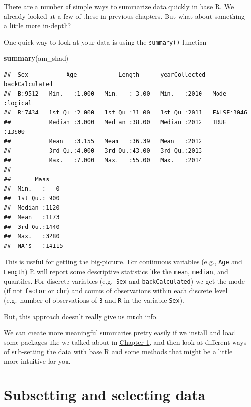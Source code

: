 \documentclass[
]{book}
\newenvironment{Shaded}{\begin{snugshade}}{\end{snugshade}}
\newcommand{\KeywordTok}[1]{\textcolor[rgb]{0.13,0.29,0.53}{\textbf{#1}}}
\newcommand{\NormalTok}[1]{#1}
\begin{document}
There are a number of simple ways to summarize data quickly in base R. We already looked at a few of these in previous chapters. But what about something a little more in-depth?

One quick way to look at your data is using the \texttt{summary()} function

\begin{Shaded}
\begin{Highlighting}[]
\KeywordTok{summary}\NormalTok{(am_shad)}
\end{Highlighting}
\end{Shaded}

\begin{verbatim}
##  Sex           Age            Length      yearCollected  backCalculated 
##  B:9512   Min.   :1.000   Min.   : 3.00   Min.   :2010   Mode :logical  
##  R:7434   1st Qu.:2.000   1st Qu.:31.00   1st Qu.:2011   FALSE:3046     
##           Median :3.000   Median :38.00   Median :2012   TRUE :13900    
##           Mean   :3.155   Mean   :36.39   Mean   :2012                  
##           3rd Qu.:4.000   3rd Qu.:43.00   3rd Qu.:2013                  
##           Max.   :7.000   Max.   :55.00   Max.   :2014                  
##                                                                         
##       Mass      
##  Min.   :   0   
##  1st Qu.: 900   
##  Median :1120   
##  Mean   :1173   
##  3rd Qu.:1440   
##  Max.   :3280   
##  NA's   :14115
\end{verbatim}

This is useful for getting the big-picture. For continuous variables (e.g., \texttt{Age} and \texttt{Length}) R will report some descriptive statistics like the \texttt{mean}, \texttt{median}, and quantiles. For discrete variables (e.g.~\texttt{Sex} and \texttt{backCalculated}) we get the mode (if not \texttt{factor} or \texttt{chr}) and counts of observations within each discrete level (e.g.~number of observations of \texttt{B} and \texttt{R} in the variable \texttt{Sex}).

But, this approach doesn't really give us much info.

We can create more meaningful summaries pretty easily if we install and load some packages like we talked about in \protect\hyperlink{Chapter1}{Chapter 1}, and then look at different ways of sub-setting the data with base R and some methods that might be a little more intuitive for you.

\hypertarget{subsetting-and-selecting-data}{%
\section{Subsetting and selecting data}\label{subsetting-and-selecting-data}}
\end{document}
